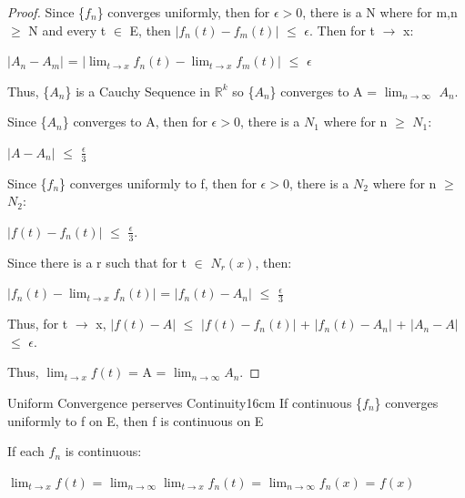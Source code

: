    \begin{proof}
        Since \{$f_n$\} converges uniformly, then for $\epsilon > 0$,
        there is a N where for m,n $\geq$ N and every t $\in$ E, then
        $|f_n(t) - f_m(t)|$ $\leq$ $\epsilon$.
        Then for t $\rightarrow$ x:

        \hspace{0.5cm}
        $|A_n - A_m|$
        = $|\lim_{t \rightarrow x} f_n(t) - \lim_{t \rightarrow x} f_m(t)|$
        $\leq$ $\epsilon$

        Thus, \{$A_n$\} is a Cauchy Sequence in $\mathbb{R}^k$ so \{$A_n$\}
        converges to A = $\lim_{n \rightarrow \infty}$ $A_n$.

        Since \{$A_n$\} converges to A, then for $\epsilon > 0$, there is a
        $N_1$ where for n $\geq$ $N_1$:

        \hspace{0.5cm}
        $|A - A_n|$ $\leq$ $\frac{\epsilon}{3}$

        Since \{$f_n$\} converges uniformly to f, then for $\epsilon > 0$,
        there is a $N_2$ where for n $\geq$ $N_2$:

        \hspace{0.5cm}
        $|f(t) - f_n(t)|$ $\leq$ $\frac{\epsilon}{3}$.

        Since there is a r such that for t $\in$ $N_r(x)$, then:

        \hspace{0.5cm}
        $|f_n(t) - \lim_{t \rightarrow x} f_n(t)|$
        = $|f_n(t) - A_n|$
        $\leq$ $\frac{\epsilon}{3}$

        Thus, for t $\rightarrow$ x, 
        $|f(t) - A|$
        $\leq$ $|f(t) - f_n(t)|$ + $|f_n(t) - A_n|$ + $|A_n - A|$
        $\leq$ $\epsilon$.

        Thus, $\lim_{t \rightarrow x} f(t)$ = A = $\lim_{n \rightarrow \infty} A_n$.
    \end{proof}

    \vspace{0.5cm}



    \begin{wtheorem}{Uniform Convergence perserves Continuity}{16cm}
        If continuous \{$f_n$\} converges uniformly to f on E,
        then f is continuous on E
    \end{wtheorem}

    \begin{intuition}
        If each $f_n$ is continuous:

        \hspace{0.5cm}
        $\lim_{t \rightarrow x} f(t)$
        = $\lim_{n \rightarrow \infty} \lim_{t \rightarrow x} f_n(t)$
        = $\lim_{n \rightarrow \infty} f_n(x)$
        = $f(x)$
    \end{intuition}

